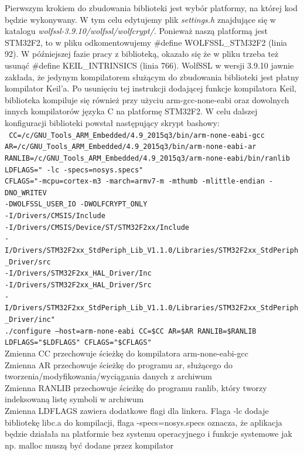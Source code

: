 \documentclass[oneside]{mgr}
\begin{document}
Pierwszym krokiem do zbudowania biblioteki jest wybór platformy, na której kod będzie wykonywany. W tym celu edytujemy plik \textit{settings.h} znajdujące się w katalogu \textit{wolfssl-3.9.10/wolfssl/wolfcrypt/}. Ponieważ naszą platformą jest STM32F2, to w pliku odkomentowujemy \#define WOLFSSL\_STM32F2 (linia 92). W późniejszej fazie pracy z biblioteką, okazało się że w pliku trzeba też usunąć \#define KEIL\_INTRINSICS (linia 766). WolfSSL w wersji 3.9.10 jawnie zakłada, że jedynym kompilatorem służącym do zbudowania biblioteki jest płatny kompilator Keil'a. Po usunięciu tej instrukcji dodającej funkcje kompilatora Keil, biblioteka kompiluje się również przy użyciu arm-gcc-none-eabi oraz dowolnych innych kompilatorów języka C na platformę STM32F2.
W celu dalszej konfiguracji biblioteki powstał następujący skrypt bashowy:\\
\texttt{
CC=/c/GNU\_Tools\_ARM\_Embedded/4.9\_2015q3/bin/arm-none-eabi-gcc\\
AR=/c/GNU\_Tools\_ARM\_Embedded/4.9\_2015q3/bin/arm-none-eabi-ar\\
RANLIB=/c/GNU\_Tools\_ARM\_Embedded/4.9\_2015q3/arm-none-eabi/bin/ranlib\\
LDFLAGS=" -lc -specs=nosys.specs"\\
CFLAGS="-mcpu=cortex-m3 -march=armv7-m -mthumb -mlittle-endian -DNO\_WRITEV \\-DWOLFSSL\_USER\_IO -DWOLFCRYPT\_ONLY\\-I/Drivers/CMSIS/Include\\-I/Drivers/CMSIS/Device/ST/STM32F2xx/Include\\-I/Drivers/STM32F2xx\_StdPeriph\_Lib\_V1.1.0/Libraries/STM32F2xx\_StdPeriph\_Driver/src\\-I/Drivers/STM32F2xx\_HAL\_Driver/Inc \\-I/Drivers/STM32F2xx\_HAL\_Driver/Src\\-I/Drivers/STM32F2xx\_StdPeriph\_Lib\_V1.1.0/Libraries/STM32F2xx\_StdPeriph\_Driver/inc"\\
./configure --host=arm-none-eabi CC=\$CC AR=\$AR RANLIB=\$RANLIB LDFLAGS="\$LDFLAGS" CFLAGS="\$CFLAGS"	
}
\\Zmienna CC przechowuje ścieżkę do kompilatora arm-none-eabi-gcc
\\Zmienna AR przechowuje ścieżkę do programu ar, służącego do tworzenia/modyfikowania/wyciągania danych z archiwum
\\Zmienna RANLIB przechowuje ścieżkę do programu ranlib, który tworzy indeksowaną listę symboli w archiwum
\\Zmienna LDFLAGS zawiera dodatkowe flagi dla linkera. Flaga -lc dodaje bibliotekę libc.a do kompilacji, flaga -specs=nosys.specs oznacza, że aplikacja będzie działała na platformie bez systemu operacyjnego i funkcje systemowe jak np. malloc muszą być dodane przez kompilator
\end{document}

